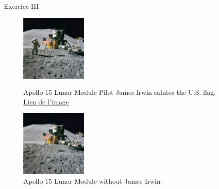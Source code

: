 \documentclass[10pt,svgnames,usenames,table]{beamer}
\begin{document}
	\begin{frame}{Exercice III}

		\begin{figure}[H]
			\centering
			\begin{minipage}{.5\textwidth}
				\centering
				\includegraphics[height=125px]{Images/purge/Apollo_15_flag,_rover,_LM,_Irwin}
				\caption{\tiny{Apollo 15 Lunar Module Pilot James Irwin salutes the U.S. flag.\\\href{http://louvainlinux.github.io/atelier-gimp/src/Images/purge/Apollo_15_flag,_rover,_LM,_Irwin.jpg}{Lien de l'image}}}
			\end{minipage}%
			\begin{minipage}{.5\textwidth}
				\centering
				\includegraphics[height=125px]{Images/purge/Apollo_15_flag,_rover,_LM}
				\caption{\tiny{Apollo 15 Lunar Module without James Irwin}}
			\end{minipage}
		\end{figure}
	\end{frame}

\end{document}
